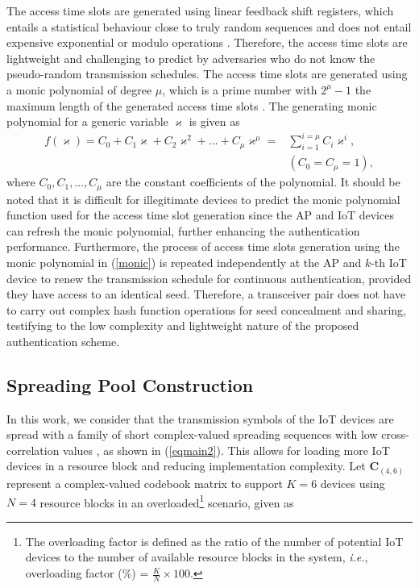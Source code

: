 \documentclass[journal,10pt]{IEEEtran}
\begin{document}
The access time slots are generated using linear feedback shift registers, which entails a statistical behaviour close to truly random sequences and does not entail expensive exponential or modulo operations \cite{bardell1987built}. Therefore, the access time slots are lightweight and challenging to predict by adversaries who do not know the pseudo-random transmission schedules. The access time slots are generated using a monic polynomial of degree $\mu$, which is a prime number with $2^{\mu} - 1$ the maximum length of the generated access time slots \cite{fraleigh2003first}. The generating monic polynomial for a generic variable $\varkappa$ is given as
\begin{equation} \label{monic}
\begin{split}
     f(\varkappa) = C_0 + C_1 \varkappa + C_2 \varkappa^2 + \hdots + C_{\mu} \varkappa^{\mu} =& \sum_{i=1}^{i=\mu} C_i \varkappa^i, \\ & (C_0 = C_{\mu} = 1),
\end{split}
\end{equation}
where $C_0, C_1, \hdots, C_\mu$ are the constant coefficients of the polynomial. It should be noted that it is difficult for illegitimate devices to predict the monic polynomial function used for the access time slot generation since the AP and IoT devices can refresh the monic polynomial, further enhancing the authentication performance. Furthermore, the process of access time slots generation using the monic polynomial in (\ref{monic}) is repeated independently at the AP and $k$-th IoT device to renew the transmission schedule for continuous authentication, provided they have access to an identical seed. Therefore, a transceiver pair does not have to carry out complex hash function operations for seed concealment and sharing, testifying to the low complexity and lightweight nature of the proposed authentication scheme. 


\subsection{Spreading Pool Construction}
In this work, we consider that the transmission symbols of the IoT devices are spread with a family of short complex-valued spreading sequences with low cross-correlation values \cite{yuan2016multi, 10178037}, as shown in (\ref{eqmain2}). This allows for loading more IoT devices in a resource block and reducing implementation complexity. Let $\mathbf{C}_{(4,6)}$ represent a complex-valued codebook matrix to support $K = 6$ devices using $N = 4$ resource blocks in an overloaded\footnote{The overloading factor is defined as the ratio of the number of potential IoT devices to the number of available resource blocks in the system, \emph{i.e.}, overloading factor (\%) = $\frac{K}{N} \times 100$.} scenario, given as
\end{document}
